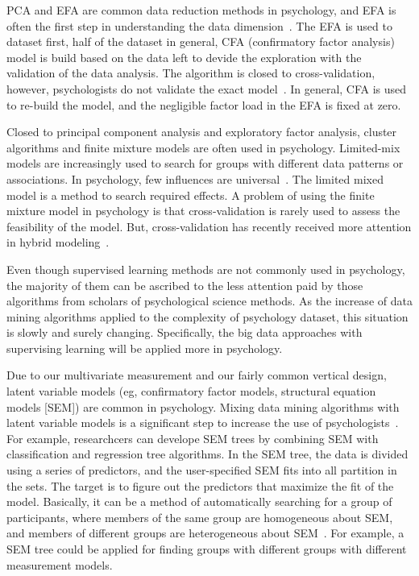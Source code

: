 PCA and EFA are common data reduction methods in psychology, 
and EFA is often the first step in understanding the data
 dimension~\cite{hid515-11}. 
The EFA is used to dataset first, half of the dataset in general, 
CFA (confirmatory factor analysis) model
 is build based on the data left to devide 
the exploration with the validation of the data analysis. The 
algorithm is closed to cross-validation, however, psychologists 
do not validate the exact model~\cite{hid515-11}. 
In general, CFA is used to re-build the model, 
and the negligible factor load 
in the EFA is fixed at zero.

Closed to principal component analysis and exploratory factor 
analysis, cluster algorithms and finite mixture models
 are often used in psychology. 
Limited-mix models 
are increasingly used to search for groups with different data 
patterns or associations. In psychology, few influences are 
universal~\cite{hid515-11}. 
The limited mixed model is a method to 
search required effects. A problem of using the finite 
mixture model in psychology is that cross-validation is rarely used
 to assess the feasibility of the model. But, cross-validation
 has recently received more attention in hybrid 
modeling~\cite{hid515-11}.

Even though supervised learning methods are not commonly used in 
psychology, the majority of them can be ascribed to the less 
attention paid by those algorithms from scholars of psychological 
science methods. 
As the increase of data mining algorithms applied to 
the complexity of psychology dataset, this situation is 
slowly and surely changing. Specifically, the big data 
approaches with supervising learning will be applied more in 
psychology.

Due to our multivariate measurement and our fairly common vertical
 design, latent variable models (eg, confirmatory factor models, 
structural equation models [SEM]) are common in psychology. 
Mixing data mining algorithms with latent variable models is a 
significant step to increase the use of 
psychologists~\cite{hid515-11}. 
For example, researchcers can
develope SEM trees by combining SEM with classification and 
regression 
tree algorithms. In the SEM tree, the data is divided using a 
series of predictors, and the user-specified SEM fits into all
partition in the sets. The target is to figure out 
the predictors that 
maximize the fit of the model. Basically, it can be a method of 
automatically searching for a group of participants, where members
 of the same group are homogeneous about SEM, and members of 
different groups are heterogeneous about SEM~\cite{hid515-11}. 
For example, a SEM tree could be applied for
 finding groups with different groups with 
different measurement models.

